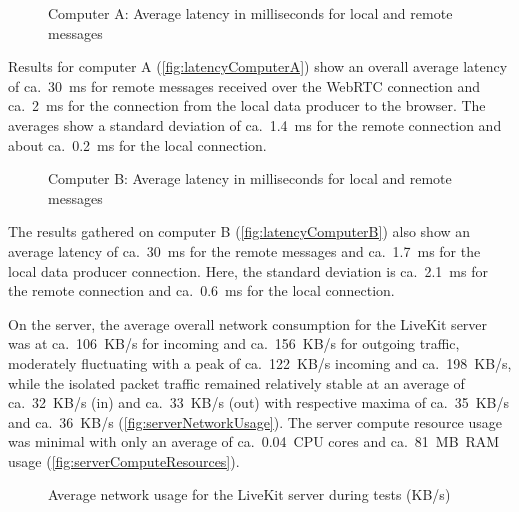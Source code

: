 \begin{figure}[!h]
\centering

\caption[Message latency on Computer A]{Computer A: Average latency in milliseconds for local and remote messages\protect}
\label{fig:latencyComputerA}
\end{figure}

Results for computer A (\autoref{fig:latencyComputerA}) show an overall average latency of ca.~30~\ac{ms} for remote messages received over the \ac{WebRTC} connection and ca.~2~\ac{ms} for the connection from the local data producer to the browser.
The averages show a standard deviation of ca.~1.4~\ac{ms} for the remote connection and about ca.~0.2~\ac{ms} for the local connection.

\begin{figure}[!h]
\centering

\caption[Message latency on Computer B]{Computer B: Average latency in milliseconds for local and remote messages\protect}
\label{fig:latencyComputerB}
\end{figure}

The results gathered on computer B (\autoref{fig:latencyComputerB}) also show an average latency of ca.~30~\ac{ms} for the remote messages and ca.~1.7~\ac{ms} for the local data producer connection.
Here, the standard deviation is ca.~2.1~\ac{ms} for the remote connection and ca.~0.6~\ac{ms} for the local connection.

On the server, the average overall network consumption for the LiveKit server was at ca.~106~\ac{KB/s} for incoming and ca.~156~KB/s for outgoing traffic, moderately fluctuating with a peak of ca.~122~\ac{KB/s} incoming and ca.~198~\ac{KB/s}, while the isolated packet traffic remained relatively stable at an average of ca.~32~\ac{KB/s} (in) and ca.~33~\ac{KB/s} (out) with respective maxima of ca.~35~\ac{KB/s} and ca.~36~\ac{KB/s} (\autoref{fig:serverNetworkUsage}).
The server compute resource usage was minimal with only an average of ca.~0.04~\ac{CPU} cores and ca.~81~\ac{MB}~\ac{RAM} usage (\autoref{fig:serverComputeResources}).

\begin{figure*}[!ht]
\hfill

\caption[Server network usage during tests]{Average network usage for the LiveKit server during tests (\ac{KB/s})\protect}
\label{fig:serverNetworkUsage}
\end{figure*}

